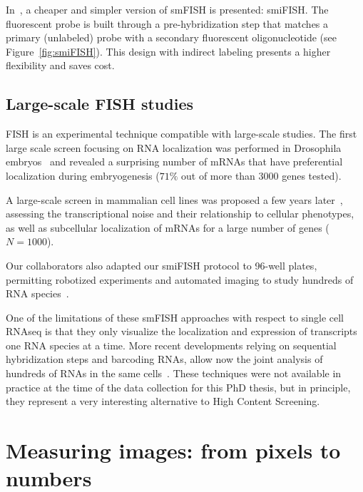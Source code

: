 In~\cite{tsanov_smifish_2016}, a cheaper and simpler version of \ac{smFISH} is presented: \ac{smiFISH}.
The fluorescent probe is built through a pre-hybridization step that matches a primary (unlabeled) probe with a secondary fluorescent oligonucleotide (see Figure~\ref{fig:smiFISH}).
This design with indirect labeling presents a higher flexibility and saves cost.

\subsection{Large-scale FISH studies}
\label{subsec:intro_scale_fish}

FISH is an experimental technique compatible with large-scale studies.
The first large scale screen focusing on RNA localization was performed in Drosophila embryos~\cite{lecuyer_global_2007} and revealed a surprising number of \ac{mRNA}s that have preferential localization during embryogenesis ($71\%$ out of more than 3000 genes tested). 

A large-scale screen in mammalian cell lines was proposed a few years later~\cite{battich_image-based_2013, battich_control_2015}, assessing the transcriptional noise and their relationship to cellular phenotypes, as well as subcellular localization of \ac{mRNA}s for a large number of genes ($N = 1000$). 

Our collaborators also adapted our \ac{smiFISH} protocol to 96-well plates, permitting robotized experiments and automated imaging to study hundreds of \ac{RNA} species~\cite{tsanov_smifish_2016, safieddine_choreography_2021}.

One of the limitations of these \ac{smFISH} approaches with respect to single cell RNAseq is that they only visualize the localization and expression of transcripts one \ac{RNA} species at a time.
More recent developments relying on sequential hybridization steps and barcoding \ac{RNA}s, allow now the joint analysis of hundreds of \ac{RNA}s in the same cells~\cite{lubeck_single_cell_2014, Chen_2015, eng_seqfish_2019, fazalAtlasSubcellularRNA2019}.
These techniques were not available in practice at the time of the data collection for this PhD thesis, but in principle, they represent a very interesting alternative to High Content Screening.

\section{Measuring images: from pixels to numbers}
\label{sec:computation_biology}

